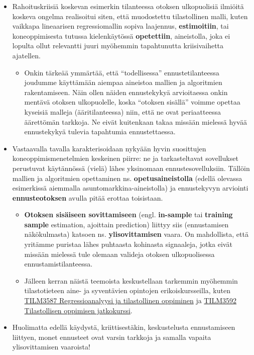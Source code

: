 \documentclass[
]{book}
\providecommand{\tightlist}{%
  \setlength{\itemsep}{0pt}\setlength{\parskip}{0pt}}
\begin{document}
\begin{itemize}
\tightlist
\item
  Rahoituskriisiä koskevan esimerkin tilanteessa otoksen ulkopuolisiä ilmiöitä koskeva ongelma realisoitui siten, että muodostettu tilastollinen malli, kuten vaikkapa lineaarisen regressiomallin sopiva laajennus, \textbf{estimoitiin}, tai koneoppimisesta tutussa kielenkäytössä \textbf{opetettiin}, aineistolla, joka ei lopulta ollut relevantti juuri myöhemmin tapahtunutta kriisivaihetta ajatellen.

  \begin{itemize}
  \tightlist
  \item
    Onkin tärkeää ymmärtää, että ``todellisessa'' ennustetilanteessa joudumme käyttämään aiempaa aineistoa mallien ja algoritmien rakentamiseen. Näin ollen näiden ennustekykyä arvioitaessa onkin mentävä otoksen ulkopuolelle, koska ``otoksen sisällä'' voimme opettaa kyseisiä malleja (ääritilanteessa) niin, että ne ovat periaatteessa äärettömän tarkkoja. Ne eivät kuitenkaan takaa missään mielessä hyvää ennustekykyä tulevia tapahtumia ennustettaessa.
  \end{itemize}
\item
  Vastaavalla tavalla karakterisoidaan nykyään hyvin suosittujen koneoppimismenetelmien keskeinen piirre: ne ja tarkasteltavat sovellukset perustuvat käytännössä (vielä) lähes yksinomaan ennustesovelluksiin. Tällöin mallien ja algoritmien opettaminen ns. \textbf{opetusaineistolla} (edellä olevassa esimerkissä aiemmalla asuntomarkkina-aineistolla) ja ennustekyvyn arviointi \textbf{ennusteotoksen} avulla pitää erottaa toisistaan.

  \begin{itemize}
  \tightlist
  \item
    \textbf{Otoksen sisäiseen sovittamiseen} (engl. \textbf{in-sample} tai \textbf{training sample} estimation, ajoittain prediction) liittyy siis (ennustamisen näkökulmasta) katsoen ns. \textbf{ylisovittamisen} vaara. On mahdollista, että yritämme puristaa lähes puhtaasta kohinasta signaaleja, jotka eivät missään mielessä tule olemaan valideja otoksen ulkopuolisessa ennustamistilanteessa.
  \item
    Jälleen kerran näistä teemoista keskustellaan tarkemmin myöhemmin tilastotieteen aine- ja syventävien opintojen erikoiskursseilla, kuten \href{https://opas.peppi.utu.fi/fi/opintojakso/TILM3587/6975}{TILM3587 Regressioanalyysi ja tilastollinen oppiminen} ja \href{https://opas.peppi.utu.fi/fi/opintojakso/TILM3592/13413}{TILM3592 Tilastollisen oppimisen jatkokurssi}.
  \end{itemize}
\item
  Huolimatta edellä käydystä, kriittisestäkin, keskustelusta ennustamiseen liittyen, monet ennusteet ovat varsin tarkkoja ja samalla vapaita ylisovittamisen vaaroista!
\end{itemize}
\end{document}
